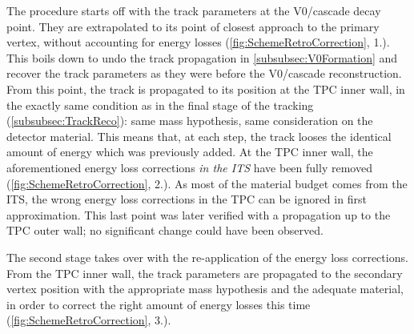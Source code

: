 The procedure starts off with the track parameters at the V0/cascade decay point. They are extrapolated to its point of closest approach to the primary vertex, without accounting for energy losses (\fig\ref{fig:SchemeRetroCorrection}, 1.). This boils down to undo the track propagation in \Sec\ref{subsubsec:V0Formation} and recover the track parameters as they were before the V0/cascade reconstruction. From this point, the track is propagated to its position at the TPC inner wall, in the exactly same condition as in the final stage of the tracking (\Sec\ref{subsubsec:TrackReco}): same mass hypothesis, same consideration on the detector material. This means that, at each step, the track looses the identical amount of energy which was previously added. At the TPC inner wall, the aforementioned energy loss corrections \textit{in the ITS} have been fully removed (\fig\ref{fig:SchemeRetroCorrection}, 2.). As most of the material budget comes from the ITS, the wrong energy loss corrections in the TPC can be ignored in first approximation. This last point was later verified with a propagation up to the TPC outer wall; no significant change could have been observed.  

The second stage takes over with the re-application of the energy loss corrections. From the TPC inner wall, the track parameters are propagated to the secondary vertex position with the appropriate mass hypothesis and the adequate material, in order to correct the right amount of energy losses this time (\fig\ref{fig:SchemeRetroCorrection}, 3.).\\

